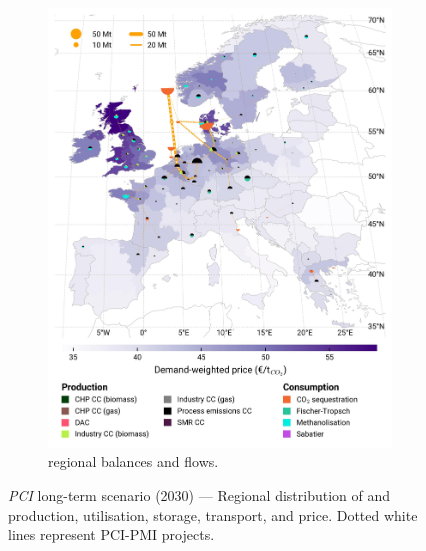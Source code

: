 \documentclass[final,5p,times,twocolumn,sort&compress]{elsarticle}
\begin{document}
\begin{figure}[htbp]
\begin{subfigure}[t]{0.49\textwidth}
      \includegraphics[width=1\textwidth]{maps/pcipmi-national-international-expansion/base_s_adm___2030-balance_map_co2_stored} 
      \vspace{-0.7cm}
      \caption{ regional balances and flows.}
      \label{fig:PCI-in_lt_2030_co2}
  \end{subfigure}
  \caption{\textit{PCI} long-term scenario (2030) --- Regional distribution of  and  production, utilisation, storage, transport, and price. Dotted white lines represent PCI-PMI projects.}
  \label{fig:PCI-in_lt_2030}
\end{figure}
\end{document}
